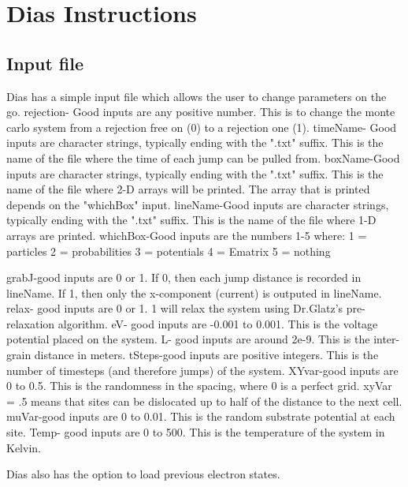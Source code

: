 \chapter{Dias Instructions}
\section{Input file}
Dias has a simple input file which allows the user to change parameters on the go. 
rejection- Good inputs are any positive number. This is to change the monte carlo system from a rejection free on (0) to a rejection one (1). 
timeName- Good inputs are character strings, typically ending with the ".txt" suffix. This is the name of the file where the time of each jump can be pulled from. 
boxName-Good inputs are character strings, typically ending with the ".txt" suffix. This is the name of the file where 2-D arrays will be printed. The array that is printed depends on the "whichBox" input.
lineName-Good inputs are character strings, typically ending with the ".txt" suffix. This is the name of the file where 1-D arrays are printed.
whichBox-Good inputs are the numbers 1-5 where:
	1 = particles
	2 = probabilities
	3 = potentials
	4 = Ematrix
	5 = nothing

grabJ-good inputs are 0 or 1. If 0, then each jump distance is recorded in lineName. If 1, then only the x-component (current) is outputed in lineName.
relax- good inputs are 0 or 1. 1 will relax the system using Dr.Glatz's pre-relaxation algorithm. 
eV- good inputs are -0.001 to 0.001. This is the voltage potential placed on the system. 
L- good inputs are around 2e-9. This is the inter-grain distance in meters. 
tSteps-good inputs are positive integers. This is the number of timesteps (and therefore jumps) of the system.
XYvar-good inputs are 0 to 0.5. This is the randomness in the spacing, where 0 is a perfect grid. xyVar = .5 means that sites can be dislocated up to half of the distance to the next cell. 
muVar-good inputs are 0 to 0.01. This is the random substrate potential at each site. 
Temp- good inputs are 0 to 500. This is the temperature of the system in Kelvin. 



Dias also has the option to load previous electron states.
